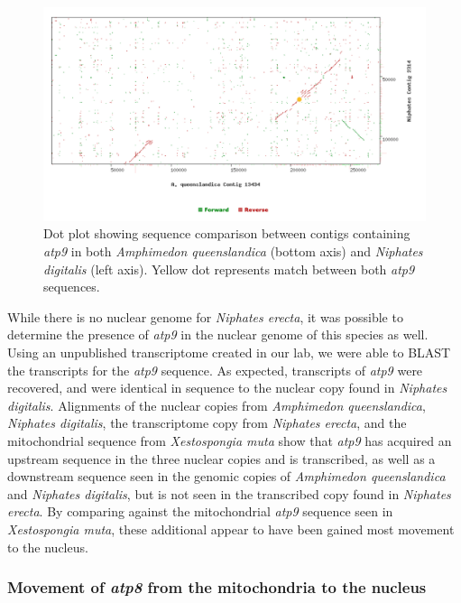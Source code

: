 \documentclass[../main.tex]{subfiles}
\begin{document}
\begin{figure}[htp]
    \centering
    \includegraphics[width=1.0\textwidth]{Figures/figure 2.png}
    \caption{Dot plot showing sequence comparison between contigs containing \emph{atp9} in both \emph{Amphimedon queenslandica} (bottom axis) and \emph{Niphates digitalis} (left axis). Yellow dot represents match between both \emph{atp9} sequences.}
\end{figure}

While there is no nuclear genome for \emph{Niphates erecta}, it was possible to determine the presence of \emph{atp9} in the nuclear genome of this species as well. Using an unpublished transcriptome created in our lab, we were able to BLAST the transcripts for the \emph{atp9} sequence. As expected, transcripts of \emph{atp9} were recovered, and were identical in sequence to the nuclear copy found in \emph{Niphates digitalis}. Alignments of the nuclear copies from \emph{Amphimedon queenslandica}, \emph{Niphates digitalis}, the transcriptome copy from \emph{Niphates erecta}, and the mitochondrial sequence from \emph{Xestospongia muta} show that \emph{atp9} has acquired an upstream sequence in the three nuclear copies and is transcribed, as well as a downstream sequence seen in the genomic copies of \emph{Amphimedon queenslandica} and \emph{Niphates digitalis}, but is not seen in the transcribed copy found in \emph{Niphates erecta}. By comparing against the mitochondrial \emph{atp9} sequence seen in \emph{Xestospongia muta}, these additional appear to have been gained most movement to the nucleus.

\subsubsection{Movement of \emph{atp8} from the mitochondria to the nucleus}
\end{document}
